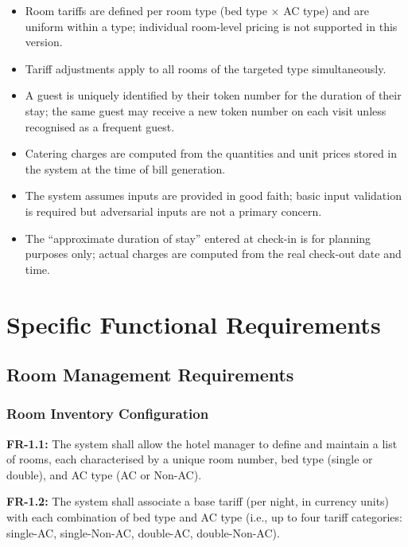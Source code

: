 \documentclass[12pt,a4paper]{article}
\newcommand{\req}[2]{%
  \noindent\textbf{\color{medblue}#1:} #2\par\smallskip
}
\begin{document}
\begin{itemize}[leftmargin=1.5em]
  \item Room tariffs are defined per room type (bed type $\times$ AC type) and are uniform
        within a type; individual room-level pricing is not supported in this version.
  \item Tariff adjustments apply to all rooms of the targeted type simultaneously.
  \item A guest is uniquely identified by their token number for the duration of their stay;
        the same guest may receive a new token number on each visit unless recognised as a
        frequent guest.
  \item Catering charges are computed from the quantities and unit prices stored in the
        system at the time of bill generation.
  \item The system assumes inputs are provided in good faith; basic input validation is
        required but adversarial inputs are not a primary concern.
  \item The ``approximate duration of stay'' entered at check-in is for planning purposes
        only; actual charges are computed from the real check-out date and time.
\end{itemize}

\newpage

\section{Specific Functional Requirements}

\subsection{Room Management Requirements}

\subsubsection{Room Inventory Configuration}

\req{FR-1.1}{The system shall allow the hotel manager to define and maintain a list of
rooms, each characterised by a unique room number, bed type (single or double), and
AC type (AC or Non-AC).}

\req{FR-1.2}{The system shall associate a base tariff (per night, in currency units) with
each combination of bed type and AC type (i.e., up to four tariff categories: single-AC,
single-Non-AC, double-AC, double-Non-AC).}
\end{document}
